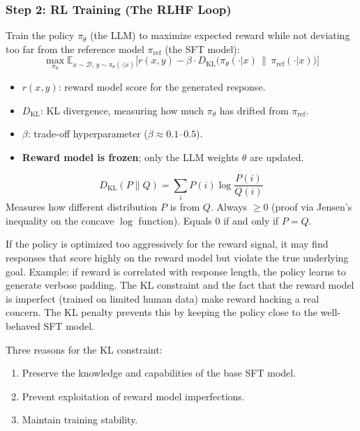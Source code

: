 \documentclass[11pt, a4paper]{article}
\begin{document}
\subsubsection{Step 2: RL Training (The RLHF Loop)}

\begin{defbox}
Train the policy $\pi_\theta$ (the LLM) to maximize expected reward while not deviating too far from the reference model $\pi_{\text{ref}}$ (the SFT model):
\[
\max_{\pi_\theta} \mathbb{E}_{x \sim \mathcal{D},\, y \sim \pi_\theta(\cdot|x)}\!\Big[r(x, y) - \beta \cdot D_{\text{KL}}\!\big(\pi_\theta(\cdot|x) \,\|\, \pi_{\text{ref}}(\cdot|x)\big)\Big]
\]
\begin{itemize}[leftmargin=1.5em]
  \item $r(x, y)$: reward model score for the generated response.
  \item $D_{\text{KL}}$: KL divergence, measuring how much $\pi_\theta$ has drifted from $\pi_{\text{ref}}$.
  \item $\beta$: trade-off hyperparameter ($\beta \approx 0.1$--$0.5$).
  \item \textbf{Reward model is frozen}; only the LLM weights $\theta$ are updated.
\end{itemize}
\end{defbox}

\begin{defbox}[KL Divergence]
\[
D_{\text{KL}}(P \| Q) = \sum_i P(i) \log \frac{P(i)}{Q(i)}
\]
Measures how different distribution $P$ is from $Q$. Always $\geq 0$ (proof via Jensen's inequality on the concave $\log$ function). Equals 0 if and only if $P = Q$.
\end{defbox}

\begin{warnbox}
If the policy is optimized too aggressively for the reward signal, it may find responses that score highly on the reward model but violate the true underlying goal. Example: if reward is correlated with response length, the policy learns to generate verbose padding. The KL constraint and the fact that the reward model is imperfect (trained on limited human data) make reward hacking a real concern. The KL penalty prevents this by keeping the policy close to the well-behaved SFT model.

Three reasons for the KL constraint:
\begin{enumerate}[leftmargin=1.5em]
  \item Preserve the knowledge and capabilities of the base SFT model.
  \item Prevent exploitation of reward model imperfections.
  \item Maintain training stability.
\end{enumerate}
\end{warnbox}
\end{document}
